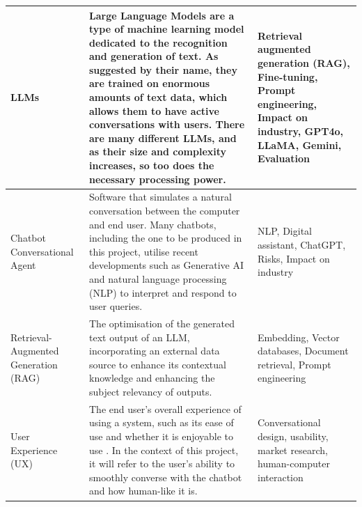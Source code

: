 \documentclass[12pt]{report}
\begin{document}
\begin{table}[H]
\begin{tabular}{|p{}|p{} | p{}|}
            \\

            \hline
            
            LLMs & Large Language Models are a type of machine learning model dedicated to the recognition and generation of text.
            As suggested by their name, they are trained on enormous amounts of text data, which allows them 
            to have active conversations with users. There are many different LLMs, and as their size and 
            complexity increases, so too does the necessary processing power. &
            Retrieval augmented generation (RAG), Fine-tuning, Prompt engineering, Impact on industry,
            GPT4o, LLaMA, Gemini, Evaluation
            
            \\

            \hline
            Chatbot \newline Conversational Agent & Software that simulates a natural conversation between the 
            computer and end user. Many chatbots, including the one to be produced in this project, utilise recent
            developments such as Generative AI and natural language processing (NLP) to interpret and respond to user queries.
            \autocite{IBMChatbotDef}
            & NLP, Digital assistant, ChatGPT, Risks, Impact on industry \\

            \hline 

            Retrieval-Augmented Generation \newline (RAG) & The optimisation of the generated text output of an LLM, incorporating
            an external data source to enhance its contextual knowledge and enhancing the subject relevancy of outputs.
            & Embedding, Vector databases, Document retrieval, Prompt engineering\\

            \hline

            User Experience (UX) & The end user's overall experience of using a system, such as its ease of use and 
            whether it is enjoyable to use \autocite{UXDict}. In the context of this project, it will refer to the user's 
            ability to smoothly converse with the chatbot and how human-like it is. 
            & Conversational design, usability, market research, human-computer interaction

            \\

            \hline 

        \end{tabular}\label{tab:themes}
    \end{table}
\end{document}
